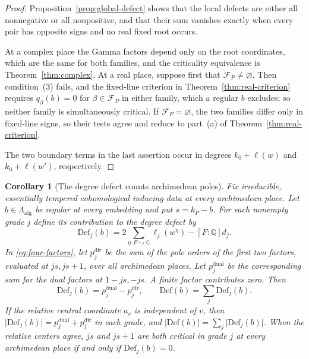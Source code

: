 \documentclass[12pt]{amsart}
\numberwithin{equation}{section}
\theoremstyle{plain}
\newtheorem{corollary}[theorem]{Corollary}
\theoremstyle{definition}
\theoremstyle{remark}
\newcommand{\Q}{\mathbb Q}
\newcommand{\C}{\mathbb C}
\newcommand{\Def}{\mathrm{Def}}
\begin{document}
\begin{proof}
Proposition~\ref{prop:global-defect} shows that the local defects are either all nonnegative or all nonpositive, and that their sum vanishes exactly when every pair has opposite signs and no real fixed root occurs.

At a complex place the Gamma factors depend only on the root coordinates, which are the same for both families, and the criticality equivalence is Theorem~\ref{thm:complex}. At a real place, suppose first that $\mathcal F_P\ne\varnothing$. Then condition~(3) fails, and the fixed-line criterion in Theorem~\ref{thm:real-criterion} requires $q_\beta(b)=0$ for $\beta\in\mathcal F_P$ in either family, which a regular $b$ excludes; so neither family is simultaneously critical. If $\mathcal F_P=\varnothing$, the two families differ only in fixed-line signs, so their tests agree and reduce to part~(a) of Theorem~\ref{thm:real-criterion}.

The two boundary terms in the last assertion occur in degrees $k_0+\ell(w)$ and $k_0+\ell(w')$, respectively.
\end{proof}

\begin{corollary}[The degree defect counts archimedean poles]
\label{cor:graded-defect-poles}
Fix irreducible, essentially tempered cohomological inducing data at every archimedean place. Let \(b\in\Lambda_{\mathrm{alg}}\) be regular at every embedding and put \(s=k_P-b\). For each nonempty grade \(j\) define its contribution to the degree defect by 
\[
 \Def_j(b)=2\sum_{\eta:F\hookrightarrow\C}\ell_j(w^\eta)
                  -[F:\Q]d_j .
\]
In \eqref{eq:four-factors}, let \(p_j^{\mathrm{dir}}\) be the sum of the pole orders of the first two factors, evaluated at \(js,js+1\), over all archimedean places. Let \(p_j^{\mathrm{dual}}\) be the corresponding sum for the dual factors at \(1-js,-js\).
A finite factor contributes zero. Then
\[
 \Def_j(b)=p_j^{\mathrm{dual}}-p_j^{\mathrm{dir}},
 \qquad \Def(b)=\sum_j\Def_j(b).
\]
If the relative central coordinate \(a_v\) is independent of \(v\), then \(\lvert\Def_j(b)\rvert=p_j^{\mathrm{dual}}+p_j^{\mathrm{dir}}\) in each grade, and \(\lvert\Def(b)\rvert=\sum_j\lvert\Def_j(b)\rvert\). When the relative centers agree, \(js\) and \(js+1\) are both critical
in grade \(j\) at every archimedean place if and only if \(\Def_j(b)=0\).
\end{corollary}
\end{document}

